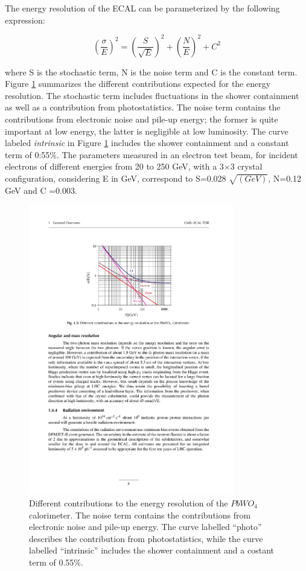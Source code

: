 The energy resolution of the ECAL can be parameterized by the following expression:

\begin{equation}
(\frac{\sigma}{E})^{2}=(\frac{S}{\sqrt{E}})^{2}+(\frac{N}{E})^{2}+C^{2}
\label{eq:ECAL_resolution}
\end{equation}

where S is the stochastic term, N is the noise term and C is the constant term. Figure \ref{fig:CMS_Ecal_resoultion}
summarizes the different contributions expected for the energy resolution. The stochastic term includes fluctuations in the shower containment as well as a contribution from photostatistics. The noise term contains the contributions from electronic noise and pile-up energy; the former is quite important at low energy, the latter is negligible at low luminosity. The curve labeled \textit{intrinsic} in Figure \ref{fig:CMS_Ecal_resoultion} includes the shower containment and a constant term of 0:55\%. The parameters measured in an electron test beam, for incident electrons of different energies from 20 to 250 GeV, with a 3$\times$3 crystal configuration, considering E in GeV, correspond to S=0.028 $\sqrt{(GeV )}$, N=0.12 GeV and C =0.003.

\begin{figure}[h!]
\begin{center}
\includegraphics[width=0.8\textwidth]{figures/CMS/ECAL/ecalTDR/resolution-13.pdf}
\caption{Different contributions to the energy resolution of the $PbWO_{4}$ calorimeter. The noise term contains the contributions from electronic noise and pile-up energy. The curve labelled ``photo'' describes the contribution from photostatistics, while the curve labelled ``intrinsic'' includes the shower containment and a costant term of 0.55\%.}
\label{fig:CMS_Ecal_resoultion}
\end{center}
\end{figure}


